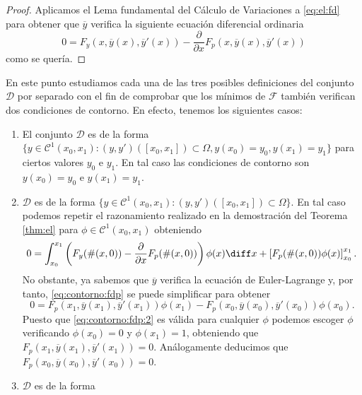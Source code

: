 \documentclass{article}
\begin{document}
\begin{proof}
  Aplicamos el Lema fundamental del Cálculo de Variaciones a \eqref{eq:el:fd} para obtener que
  $\overline{y}$ verifica la siguiente ecuación diferencial ordinaria
  \begin{equation} \label{eq:ex:edo} 0 = F_y(x, \overline{y}(x), \overline{y}'(x)) -
    \frac{\partial}{\partial x} F_p(x, \overline{y}(x), \overline{y}'(x))
  \end{equation}
  como se quería.
\end{proof}

En este punto estudiamos cada una de las tres posibles definiciones del conjunto $\mathcal{D}$ por
separado con el fin de comprobar que los mínimos de $\mathcal{F}$ también verifican dos condiciones
de contorno. En efecto, tenemos los siguientes casos:

\begin{enumerate}
\item El conjunto $\mathcal{D}$ es de la forma
  $\{y \in \mathcal{C}^1(x_0, x_1): (y, y')([x_0, x_1]) \subset \Omega, y(x_0) = y_0, y(x_1) =
  y_1\}$ para ciertos valores $y_0$ e $y_1$. En tal caso las condiciones de contorno son
  $y(x_0) = y_0$ e $y(x_1) = y_1$.
\item $\mathcal{D}$ es de la forma
  $\{y \in \mathcal{C}^1(x_0, x_1): (y, y')([x_0, x_1]) \subset \Omega\}$. En tal caso podemos
  repetir el razonamiento realizado en la demostración del Teorema \ref{thm:el} para
  $\phi \in \mathcal{C}^1(x_0, x_1)$ obteniendo
  \begin{equation} \label{eq:contorno:fdp} 0 = \int_{x_0}^{x_1} \left(F_y(\#(x, 0)) -
      \frac{\partial}{\partial x} F_p(\#(x, 0))\right) \phi(x) \diff x + \left[F_p(\#(x, 0))
      \phi(x)\right]_{x_0}^{x_1}.
  \end{equation}
  No obstante, ya sabemos que $\overline{y}$ verifica la ecuación de Euler-Lagrange y, por tanto,
  \eqref{eq:contorno:fdp} se puede simplificar para obtener
  \begin{equation} \label{eq:contorno:fdp:2} 0 = F_p(x_1, \overline{y}(x_1), \overline{y}'(x_1))
    \phi(x_1) - F_p(x_0, \overline{y}(x_0), \overline{y}'(x_0)) \phi(x_0).
  \end{equation}
  Puesto que \eqref{eq:contorno:fdp:2} es válida para cualquier $\phi$ podemos escoger $\phi$
  verificando $\phi(x_0) = 0$ y $\phi(x_1) = 1$, obteniendo que
  $F_p(x_1, \overline{y}(x_1), \overline{y}'(x_1)) = 0$. Análogamente deducimos que
  $F_p(x_0, \overline{y}(x_0), \overline{y}'(x_0)) = 0$.
\item $\mathcal{D}$ es de la forma

\end{enumerate}
\end{document}
